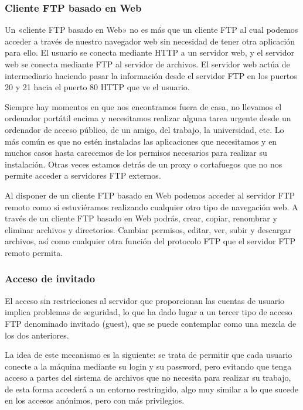 \documentclass[a4paper, 12pt]{article}
\begin{document}
\subsubsection{Cliente FTP basado en Web}


Un «cliente FTP basado en Web» no es más que un cliente FTP al cual podemos acceder a través de nuestro navegador web sin necesidad de tener otra aplicación para ello. El usuario se conecta mediante HTTP a un servidor web, y el servidor web se conecta mediante FTP al servidor de archivos. El servidor web actúa de intermediario haciendo pasar la información desde el servidor FTP en los puertos 20 y 21 hacia el puerto 80 HTTP que ve el usuario.

Siempre hay momentos en que nos encontramos fuera de casa, no llevamos el ordenador portátil encima y necesitamos realizar alguna tarea urgente desde un ordenador de acceso público, de un amigo, del trabajo, la universidad, etc. Lo más común es que no estén instaladas las aplicaciones que necesitamos y en muchos casos hasta carecemos de los permisos necesarios para realizar su instalación. Otras veces estamos detrás de un proxy o cortafuegos que no nos permite acceder a servidores FTP externos.

Al disponer de un cliente FTP basado en Web podemos acceder al servidor FTP remoto como si estuviéramos realizando cualquier otro tipo de navegación web. A través de un cliente FTP basado en Web podrás, crear, copiar, renombrar y eliminar archivos y directorios. Cambiar permisos, editar, ver, subir y descargar archivos, así como cualquier otra función del protocolo FTP que el servidor FTP remoto permita.
\subsubsection{Acceso de invitado}

El acceso sin restricciones al servidor que proporcionan las cuentas de usuario implica problemas de seguridad, lo que ha dado lugar a un tercer tipo de acceso FTP denominado invitado (guest), que se puede contemplar como una mezcla de los dos anteriores.

La idea de este mecanismo es la siguiente: se trata de permitir que cada usuario conecte a la máquina mediante su login y su password, pero evitando que tenga acceso a partes del sistema de archivos que no necesita para realizar su trabajo, de esta forma accederá a un entorno restringido, algo muy similar a lo que sucede en los accesos anónimos, pero con más privilegios.
\end{document}

